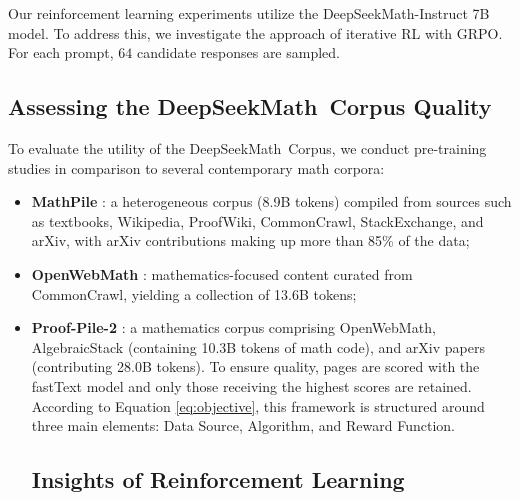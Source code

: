 \begin{itemize}[topsep=0pt]
\begin{itemize}
Our reinforcement learning experiments utilize the DeepSeekMath-Instruct 7B model. To address this, we investigate the approach of iterative RL with GRPO. For each prompt, $64$ candidate responses are sampled. \subsection{Assessing the DeepSeekMath~Corpus Quality}

To evaluate the utility of the DeepSeekMath~Corpus, we conduct pre-training studies in comparison to several contemporary math corpora:

\begin{itemize}[topsep=0pt]
    \item \textbf{MathPile} \citep{mathpile}: a heterogeneous corpus (8.9B tokens) compiled from sources such as textbooks, Wikipedia, ProofWiki, CommonCrawl, StackExchange, and arXiv, with arXiv contributions making up more than 85\% of the data;
    \item \textbf{OpenWebMath} \citep{openwebmath}: mathematics-focused content curated from CommonCrawl, yielding a collection of 13.6B tokens;
    \item \textbf{Proof-Pile-2} \citep{llemma}: a mathematics corpus comprising OpenWebMath, AlgebraicStack (containing 10.3B tokens of math code), and arXiv papers (contributing 28.0B tokens). To ensure quality, pages are scored with the fastText model and only those receiving the highest scores are retained. According to Equation \ref{eq:objective}, this framework is structured around three main elements: Data Source, Algorithm, and Reward Function. \subsection{Insights of Reinforcement Learning}

\end{itemize}
\end{itemize}
\end{itemize}
